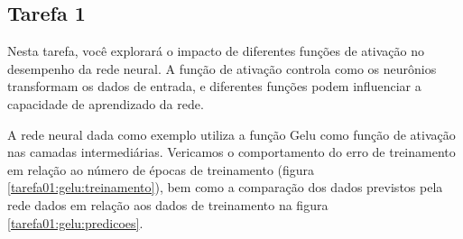 \subsection{Tarefa 1}

\begin{comandoquestao}
   Nesta tarefa, você explorará o impacto de diferentes funções de ativação no desempenho da rede neural. A função de ativação controla como os neurônios transformam os dados de entrada, e diferentes funções podem influenciar a capacidade de aprendizado da rede.
\end{comandoquestao}

A rede neural dada como exemplo utiliza a função Gelu como função de ativação nas camadas intermediárias. Vericamos o comportamento do erro de treinamento em relação ao número de épocas de treinamento (figura \ref{tarefa01:gelu:treinamento}), bem como a comparação dos dados previstos pela rede dados em relação aos dados de treinamento na figura \ref{tarefa01:gelu:predicoes}.

